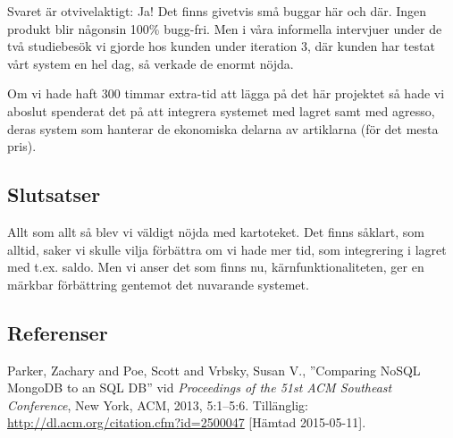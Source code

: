 Svaret är otvivelaktigt: Ja! Det finns
givetvis små buggar här och där. Ingen
produkt blir någonsin 100\% bugg-fri.
Men i våra informella intervjuer under de två studiebesök vi gjorde hos kunden
under iteration 3, där kunden har testat
vårt system en hel dag, så verkade de enormt nöjda.

Om vi hade haft 300 timmar extra-tid
att lägga på det här projektet så hade
vi aboslut spenderat det på att integrera
systemet med lagret samt med agresso, deras system
som hanterar de ekonomiska delarna av artiklarna (för det mesta pris).




\subsection{Slutsatser}
Allt som allt så blev vi väldigt nöjda med kartoteket.
Det finns såklart, som alltid, saker vi skulle vilja förbättra om vi
hade mer tid, som integrering i lagret med t.ex. saldo.
Men vi anser det som finns nu, kärnfunktionaliteten,
ger en märkbar förbättring gentemot det nuvarande systemet.




\subsection{Referenser}
\vspace{-9mm}
\begin{thebibliography}{9}
 Parker, Zachary and Poe, Scott and Vrbsky, Susan V., ''Comparing NoSQL MongoDB to an SQL DB'' vid \textit{Proceedings of the 51st ACM Southeast Conference}, New York, ACM, 2013, 5:1--5:6. Tillänglig: \url{http://dl.acm.org/citation.cfm?id=2500047} [Hämtad 2015-05-11].
\end{thebibliography}
